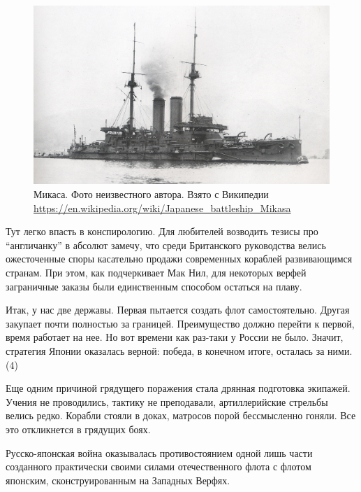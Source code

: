 \begin{figure}[h!tb] 
	\centering\includegraphics[scale=0.2]{Data/RYAV_sily_storon/A7N2WR2L-TY.jpg}
	\caption{Микаса. Фото неизвестного автора. Взято с Википедии \url{https://en.wikipedia.org/wiki/Japanese_battleship_Mikasa}
	}
\end{figure}

Тут легко впасть в конспирологию. Для любителей возводить тезисы про “англичанку” в абсолют замечу, что среди Британского руководства велись ожесточенные споры касательно продажи современных кораблей развивающимся странам. При этом, как подчеркивает Мак Нил, для некоторых верфей заграничные заказы были единственным способом остаться на плаву.

Итак, у нас две державы. Первая пытается создать флот самостоятельно. Другая закупает почти полностью за границей. Преимущество должно перейти к первой, время работает на нее. Но вот времени как раз-таки у России не было. Значит, стратегия Японии оказалась верной: победа, в конечном итоге, осталась за ними. (4)

Еще одним причиной грядущего поражения стала дрянная подготовка экипажей. Учения не проводились, тактику не преподавали, артиллерийские стрельбы велись редко. Корабли стояли в доках, матросов порой бессмысленно гоняли. Все это откликнется в грядущих боях.

Русско-японская война оказывалась противостоянием одной лишь части созданного практически своими силами отечественного флота с флотом японским, сконструированным на Западных Верфях.


